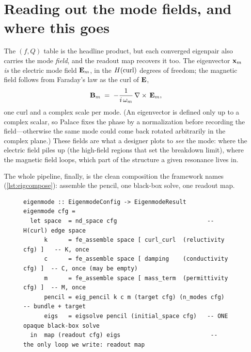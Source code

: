 \section{Reading out the mode fields, and where this goes}
\label{sec:eig-fields}

The $(f,Q)$ table is the headline product, but each converged eigenpair also
carries the mode \emph{field}, and the readout map recovers it too. The
eigenvector $\mathbf{x}_m$ \emph{is} the electric mode field $\mathbf{E}_m$, in the
$H(\mathrm{curl})$ degrees of freedom; the magnetic field follows from Faraday's law as the
curl of $\mathbf{E}$,
\begin{equation}
  \mathbf{B}_m \;=\; -\frac{1}{i\,\omega_m}\,\nabla\times\,\mathbf{E}_m,
  \label{eq:bfield}
\end{equation}
one curl and a complex scale per mode. (An eigenvector is defined only up to a
complex scalar, so Palace fixes the phase by a normalization before recording
the field---otherwise the same mode could come back rotated arbitrarily in the
complex plane.) These fields are what a designer plots to \emph{see} the mode:
where the electric field piles up (the high-field regions that set the breakdown
limit), where the magnetic field loops, which part of the structure a given
resonance lives in.

The whole pipeline, finally, is the clean composition the framework names
(\cref{lst:eigcompose}): assemble the pencil, one black-box solve, one readout
map.

\begin{figure}[t]
\begin{lstlisting}[style=l4style, caption={[The eigenmode composition]The
eigenmode feature as a composition of firm vocabulary. Assemble the
$(\Kop,\Cop,\Mop)$ pencil once (three folds), hand it to the opaque
\texttt{eigsolve} black box once, and \texttt{map} the per-mode readout over the
converged eigenpairs. The only Palace-written loop is the final \texttt{map};
the solve is a single opaque call.}, label={lst:eigcompose}]
eigenmode :: EigenmodeConfig -> EigenmodeResult
eigenmode cfg =
  let space  = nd_space cfg                          -- H(curl) edge space
      k      = fe_assemble space [ curl_curl  (reluctivity cfg) ]   -- K, once
      c      = fe_assemble space [ damping    (conductivity cfg) ]  -- C, once (may be empty)
      m      = fe_assemble space [ mass_term  (permittivity cfg) ]  -- M, once
      pencil = eig_pencil k c m (target cfg) (n_modes cfg)          -- bundle + target
      eigs   = eigsolve pencil (initial_space cfg)   -- ONE opaque black-box solve
  in  map (readout cfg) eigs                          -- the only loop we write: readout map
\end{lstlisting}
\end{figure}

